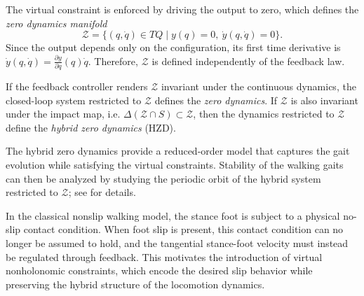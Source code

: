 \documentclass[letterpaper, 10 pt, conference]{ieeeconf}
\newcommand{\ara}[1]{\textcolor{purple}{(ARA: #1)}}
\begin{document}
The virtual constraint is enforced by driving the output to zero,
which defines the \emph{zero dynamics manifold}
\begin{equation}\label{Z}
\mathcal{Z} =
\{(q,\dot q) \in TQ \mid y(q)=0,~\dot y(q,\dot q)=0 \}.
\end{equation}
Since the output depends only on the configuration, its first time derivative is
$\dot y(q,\dot q)=\frac{\partial y}{\partial q}(q)\dot q$.
Therefore, $\mathcal Z$ is defined independently of the feedback law.

If the feedback controller renders $\mathcal{Z}$ invariant under the
continuous dynamics, the closed-loop system restricted to
$\mathcal{Z}$ defines the \emph{zero dynamics}. If $\mathcal{Z}$ is also invariant under the impact map,
i.e. $\Delta(\mathcal{Z}\cap S) \subset \mathcal{Z}$, then the dynamics restricted to $\mathcal{Z}$ define the
\emph{hybrid zero dynamics} (HZD).

The hybrid zero dynamics provide a reduced-order model that captures the gait evolution while satisfying the virtual constraints.
Stability of the walking gaits can then be analyzed by studying the periodic orbit of the hybrid system restricted to $\mathcal{Z}$; see \cite{westervelt2003hybrid} for details.

In the classical nonslip walking model, the stance foot is subject to a physical no-slip contact condition. When foot slip is present, this contact condition can no longer be assumed to hold, and the tangential stance-foot velocity must instead be regulated through feedback.
This motivates the introduction of virtual nonholonomic constraints, which encode the desired slip behavior while preserving the hybrid structure of the locomotion dynamics.


\end{document}
